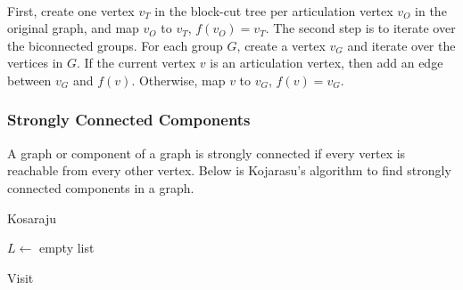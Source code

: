 \documentclass[a4paper, 12pt]{article}
\begin{document}
~\\
First, create one vertex $v_T$ in the block-cut tree per articulation vertex $v_O$ in the original graph, and map $v_O$ to $v_T$, $f(v_O) = v_T$. The second step is to iterate over the biconnected groups. For each group $G$, create a vertex $v_G$ and iterate over the vertices in $G$. If the current vertex $v$ is an articulation vertex, then add an edge between $v_G$ and $f(v)$. Otherwise, map $v$ to $v_G$, $f(v) = v_G$.

    \subsubsection{Strongly Connected Components}

A graph or component of a graph is strongly connected if every vertex is reachable from every other vertex. Below is Kojarasu's algorithm to find strongly connected components in a graph.

\vspace{0.5cm}

\IncMargin{2em}
\begin{algorithm}[H]
\caption{Kosaraju}
\vspace{0.1cm}
\Indm
{}
\Indp
\vspace{0.1cm}
$L\gets$ empty list\\
\end{algorithm}
\DecMargin{2em}

\vspace{0.5cm}

\IncMargin{2em}
\begin{algorithm}[H]
\caption{Visit}
\vspace{0.1cm}
\Indm
{}
\Indp
\vspace{0.1cm}
\end{algorithm}
\DecMargin{2em}

\vspace{0.5cm}
\end{document}
